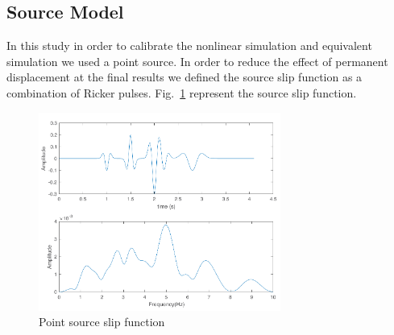 
\subsection{Source Model}

In this study in order to calibrate the nonlinear simulation and equivalent simulation we used a point source. In order to reduce the effect of permanent displacement at the final results we defined the source slip function as a combination of Ricker pulses. Fig.~\ref{fig:slip_function} represent the source slip function. 

 \begin{figure}
    \centering
    \includegraphics[width=300px]{figures/pdf/slip_function.pdf}
    \caption{Point source slip function}
    \label{fig:slip_function}
\end{figure}






